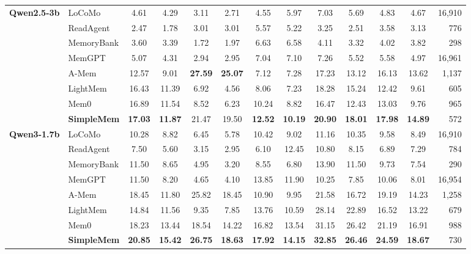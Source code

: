 \documentclass{article}
\newcommand{\ours}{SimpleMem}
\theoremstyle{plain}
\theoremstyle{definition}
\theoremstyle{remark}
\begin{document}
\begin{table}[t]
{\begin{tabular}{l|l|cc|cc|cc|cc|cc|r}
\multirow{8}{*}{\textbf{Qwen2.5-3b}} 
 & LoCoMo & 4.61 & 4.29 & 3.11 & 2.71 & 4.55 & 5.97 & 7.03 & 5.69 & 4.83 & 4.67 & 16,910 \\
 & ReadAgent & 2.47 & 1.78 & 3.01 & 3.01 & 5.57 & 5.22 & 3.25 & 2.51 & 3.58 & 3.13 & 776 \\
 & MemoryBank & 3.60 & 3.39 & 1.72 & 1.97 & 6.63 & 6.58 & 4.11 & 3.32 & 4.02 & 3.82 & 298 \\
 & MemGPT & 5.07 & 4.31 & 2.94 & 2.95 & 7.04 & 7.10 & 7.26 & 5.52 & 5.58 & 4.97 & 16,961 \\
 & A-Mem & 12.57 & 9.01 & \textbf{27.59} & \textbf{25.07} & 7.12 & 7.28 & 17.23 & 13.12 & 16.13 & 13.62 & 1,137 \\
 & LightMem & 16.43 & 11.39 & 6.92 & 4.56 & 8.06 & 7.23 & 18.28 & 15.24 & 12.42  & 9.61 & 605 \\
 & Mem0 & 16.89 & 11.54 & 8.52 & 6.23 & 10.24 & 8.82 & 16.47 & 12.43 & 13.03  & 9.76 & 965 \\
 \rowcolor{gray!10} & \textbf{\ours{}} & \textbf{17.03}  & \textbf{11.87}  & 21.47  & 19.50  & \textbf{12.52} & \textbf{10.19} & \textbf{20.90}  & \textbf{18.01}  & \textbf{17.98}  & \textbf{14.89} & 572 \\
\midrule



\multirow{8}{*}{\textbf{Qwen3-1.7b}} 
 & LoCoMo & 10.28 & 8.82 & 6.45 & 5.78 & 10.42 & 9.02 & 11.16 & 10.35 & 9.58 & 8.49 & 16,910 \\
 & ReadAgent & 7.50 & 5.60 & 3.15 & 2.95 & 6.10 & 12.45 & 10.80 & 8.15 & 6.89 & 7.29 & 784 \\
 & MemoryBank & 11.50 & 8.65 & 4.95 & 3.20 & 8.55 & 6.80 & 13.90 & 11.50 & 9.73 & 7.54 & 290 \\
 & MemGPT & 11.50 & 8.20 & 4.65 & 4.10 & 13.85 & 11.90 & 10.25 & 7.85 & 10.06 & 8.01 & 16,954 \\
 & A-Mem & 18.45  & 11.80  & 25.82  & 18.45  & 10.90  & 9.95  & 21.58  & 16.72  & 19.19  & 14.23  & 1,258 \\
 & LightMem & 14.84 & 11.56 & 9.35 & 7.85 & 13.76 & 10.59 & 28.14 & 22.89 & 16.52 & 13.22 & 679 \\
 & Mem0 & 18.23 & 13.44 & 18.54 & 14.22 & 16.82 & 13.54 & 31.15 & 26.42 & 21.19  & 16.91 & 988 \\
 \rowcolor{gray!10} & \textbf{\ours{}} & \textbf{20.85} & \textbf{15.42} & \textbf{26.75}  & \textbf{18.63}  & \textbf{17.92} & \textbf{14.15} & \textbf{32.85} & \textbf{26.46} & \textbf{24.59}  & \textbf{18.67} & 730 \\
\midrule


\end{tabular}}
\end{table}
\end{document}
